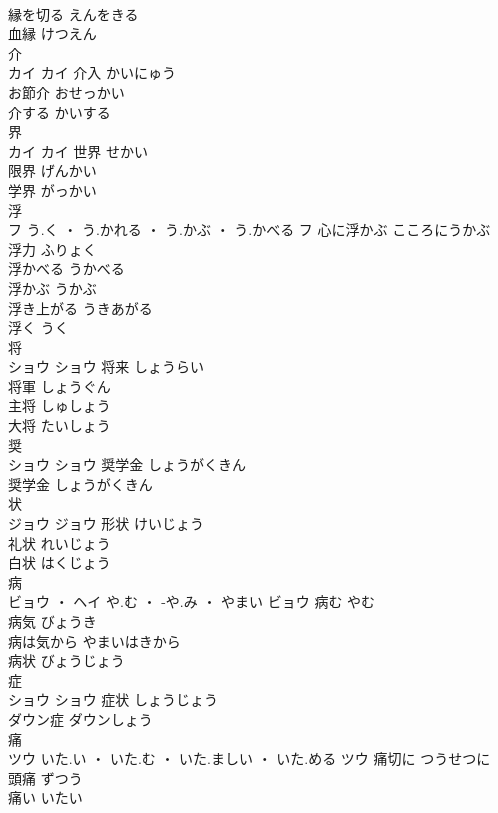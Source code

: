\documentclass[8pt]{extreport}
\begin{document}
\begin{CJK}{UTF8}{min}
\\	縁を切る	えんをきる	
\\	血縁	けつえん	
\\	介	
\\	カイ		カイ	介入	かいにゅう	
\\	お節介	おせっかい	
\\	介する	かいする	
\\	界	
\\	カイ		カイ	世界	せかい	
\\	限界	げんかい	
\\	学界	がっかい	
\\	浮	
\\	フ	う.く ・ う.かれる ・ う.かぶ ・ う.かべる	フ	心に浮かぶ	こころにうかぶ	
\\	浮力	ふりょく	
\\	浮かべる	うかべる	
\\	浮かぶ	うかぶ	
\\	浮き上がる	うきあがる	
\\	浮く	うく	
\\	将	
\\	ショウ		ショウ	将来	しょうらい	
\\	将軍	しょうぐん	
\\	主将	しゅしょう	
\\	大将	たいしょう	
\\	奨	
\\	ショウ		ショウ	奨学金	しょうがくきん	
\\	奨学金	しょうがくきん	
\\	状	
\\	ジョウ		ジョウ	形状	けいじょう	
\\	礼状	れいじょう	
\\	白状	はくじょう	
\\	病	
\\	ビョウ ・ ヘイ	や.む ・ -や.み ・ やまい	ビョウ	病む	やむ	
\\	病気	びょうき	
\\	病は気から	やまいはきから	
\\	病状	びょうじょう	
\\	症	
\\	ショウ		ショウ	症状	しょうじょう	
\\	ダウン症	ダウンしょう	
\\	痛	
\\	ツウ	いた.い ・ いた.む ・ いた.ましい ・ いた.める	ツウ	痛切に	つうせつに	
\\	頭痛	ずつう	
\\	痛い	いたい	

\end{CJK}
\end{document}
